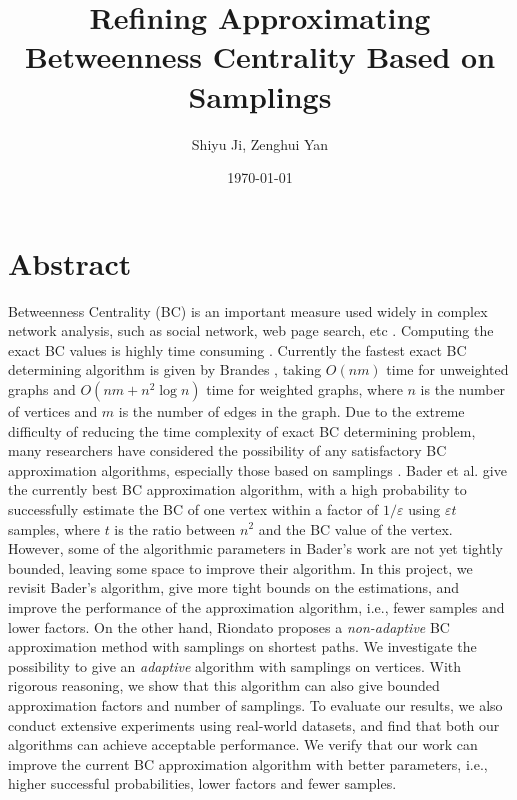 \documentclass[10pt]{article}
\begin{document}
\title{Refining Approximating Betweenness Centrality Based on Samplings}
\author{Shiyu Ji, Zenghui Yan}
\date{\today}
\maketitle

\newtheorem{definition}{Definition}
\newtheorem{theorem}{Theorem}
\newtheorem{lemma}{Lemma}
\newtheorem{corollary}{Corollary}

\newcommand{\p}{\mathrm{Pr}}

\section{Abstract}
Betweenness Centrality (BC) is an important measure used widely in complex network analysis, such as social network, web page search, etc \cite{barthelemy2004betweenness}. Computing the exact BC values is highly time consuming \cite{brandes2001faster, brandes2008variants}. Currently the fastest exact BC determining algorithm is given by Brandes \cite{brandes2001faster}, taking $O(nm)$ time for unweighted graphs and $O(nm+n^2\log n)$ time for weighted graphs, where $n$ is the number of vertices and $m$ is the number of edges in the graph. Due to the extreme difficulty of reducing the time complexity of exact BC determining problem, many researchers have considered the possibility of any satisfactory BC approximation algorithms, especially those based on samplings \cite{bader2007approximating, geisberger2008better}. Bader et al. \cite{bader2007approximating} give the currently best BC approximation algorithm, with a high probability to successfully estimate the BC of one vertex within a factor of $1/\varepsilon$ using $\varepsilon t$ samples, where $t$ is the ratio between $n^2$ and the BC value of the vertex. However, some of the algorithmic parameters in Bader's work are not yet tightly bounded, leaving some space to improve their algorithm. In this project, we revisit Bader's algorithm, give more tight bounds on the estimations, and improve the performance of the approximation algorithm, i.e., fewer samples and lower factors. On the other hand, Riondato \cite{riondato2014fast} proposes a \emph{non-adaptive} BC approximation method with samplings on shortest paths. We investigate the possibility to give an \emph{adaptive} algorithm with samplings on vertices. With rigorous reasoning, we show that this algorithm can also give bounded approximation factors and number of samplings. To evaluate our results, we also conduct extensive experiments using real-world datasets, and find that both our algorithms can achieve acceptable performance. We verify that our work can improve the current BC approximation algorithm with better parameters, i.e., higher successful probabilities, lower factors and fewer samples.
\end{document}
